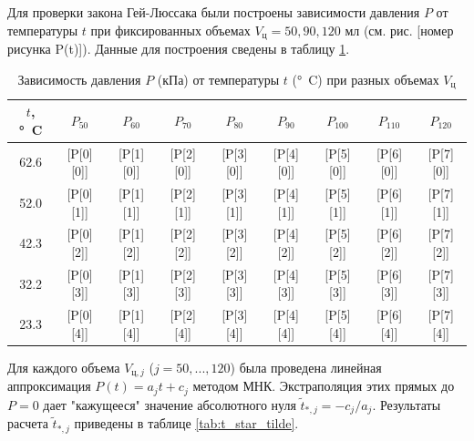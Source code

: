 \documentclass[12pt]{article}
\begin{document}
Для проверки закона Гей-Люссака были построены зависимости давления $P$ от температуры $t$ при фиксированных объемах $V_{\text{ц}} = 50, 90, 120$ мл (см. рис. [номер рисунка P(t)]). Данные для построения сведены в таблицу \ref{tab:P_vs_T}.

\begin{table}[H]
    \centering
    \caption{Зависимость давления $P$ (\si{кПа}) от температуры $t$ (\si{\degree C}) при разных объемах $V_{\text{ц}}$}
    \label{tab:P_vs_T}
    \setlength{\tabcolsep}{3pt} %
    \begin{tabular}{|c|c|c|c|c|c|c|c|c|}
        \hline
        {$t$, \si{\degree C}} & {$P_{50}$} & {$P_{60}$} & {$P_{70}$} & {$P_{80}$} & {$P_{90}$} & {$P_{100}$} & {$P_{110}$} & {$P_{120}$} \\
        \hline
        62.6 & [P[0][0]] & [P[1][0]] & [P[2][0]] & [P[3][0]] & [P[4][0]] & [P[5][0]] & [P[6][0]] & [P[7][0]] \\ \hline
        52.0 & [P[0][1]] & [P[1][1]] & [P[2][1]] & [P[3][1]] & [P[4][1]] & [P[5][1]] & [P[6][1]] & [P[7][1]] \\ \hline
        42.3 & [P[0][2]] & [P[1][2]] & [P[2][2]] & [P[3][2]] & [P[4][2]] & [P[5][2]] & [P[6][2]] & [P[7][2]] \\ \hline
        32.2 & [P[0][3]] & [P[1][3]] & [P[2][3]] & [P[3][3]] & [P[4][3]] & [P[5][3]] & [P[6][3]] & [P[7][3]] \\ \hline
        23.3 & [P[0][4]] & [P[1][4]] & [P[2][4]] & [P[3][4]] & [P[4][4]] & [P[5][4]] & [P[6][4]] & [P[7][4]] \\
        \hline
    \end{tabular}
\end{table}

Для каждого объема $V_{\text{ц},j}$ ($j = 50, ..., 120$) была проведена линейная аппроксимация $P(t) = a_j t + c_j$ методом МНК. Экстраполяция этих прямых до $P=0$ дает "кажущееся" значение абсолютного нуля $\tilde{t}_{*,j} = -c_j / a_j$. Результаты расчета $\tilde{t}_{*,j}$ приведены в таблице \ref{tab:t_star_tilde}.
\end{document}
